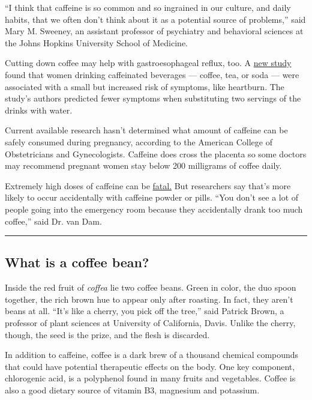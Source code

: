 ``I think that caffeine is so common and so ingrained in our culture,
and daily habits, that we often don't think about it as a potential
source of problems,'' said Mary M. Sweeney, an assistant professor of
psychiatry and behavioral sciences at the Johns Hopkins University
School of Medicine.

Cutting down coffee may help with gastroesophageal reflux, too. A
\href{https://cghjournal.org/retrieve/pii/S1542356519313801}{new study}
found that women drinking caffeinated beverages --- coffee, tea, or soda
--- were associated with a small but increased risk of symptoms, like
heartburn. The study's authors predicted fewer symptoms when
substituting two servings of the drinks with water.

Current available research hasn't determined what amount of caffeine can
be safely consumed during pregnancy, according to the American College
of Obstetricians and Gynecologists. Caffeine does cross the placenta so
some doctors may recommend pregnant women stay below 200 milligrams of
coffee daily.

Extremely high doses of caffeine can be
\href{https://www.ncbi.nlm.nih.gov/pmc/articles/PMC6011436/}{fatal.} But
researchers say that's more likely to occur accidentally with caffeine
powder or pills. ``You don't see a lot of people going into the
emergency room because they accidentally drank too much coffee,'' said
Dr. van Dam.

\begin{center}\rule{0.5\linewidth}{\linethickness}\end{center}

\hypertarget{what-is-a-coffee-bean}{%
\subsection{What is a coffee bean?}\label{what-is-a-coffee-bean}}

Inside the red fruit of \emph{coffea} lie two coffee beans. Green in
color, the duo spoon together, the rich brown hue to appear only after
roasting. In fact, they aren't beans at all. ``It's like a cherry, you
pick off the tree,'' said Patrick Brown, a professor of plant sciences
at University of California, Davis. Unlike the cherry, though, the seed
is the prize, and the flesh is discarded.

In addition to caffeine, coffee is a dark brew of a thousand chemical
compounds that could have potential therapeutic effects on the body. One
key component, chlorogenic acid, is a polyphenol found in many fruits
and vegetables. Coffee is also a good dietary source of vitamin B3,
magnesium and potassium.

